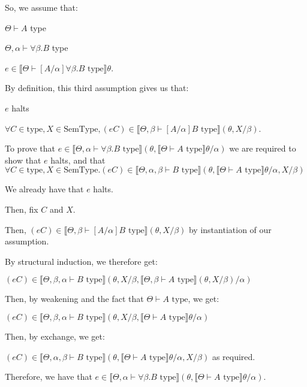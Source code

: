 \begin{enumerate}
    So, we assume that:

    $\Theta \vdash A$ type

    $\Theta, \alpha \vdash \forall \beta. B$ type

    $e \in \llbracket \Theta \vdash [A / \alpha] \forall \beta. B \text{ type}\rrbracket \theta$.

    By definition, this third assumption gives us that:

    $e$ halts

    $\forall C \in \text{type}, X \in \text{SemType}, (e C) \in \llbracket\Theta, \beta \vdash [A / \alpha]B \text{ type}\rrbracket (\theta, X / \beta)$.

    To prove that $e \in \llbracket \Theta, \alpha \vdash \forall \beta. B \text{ type}\rrbracket(\theta, \llbracket \Theta \vdash A \text{ type}\rrbracket \theta / \alpha)$ we are required to show that $e$ halts, and that $\forall C \in \text{type}, X \in \text{SemType}. (e C) \in \llbracket \Theta, \alpha, \beta \vdash B \text{ type}\rrbracket (\theta, \llbracket \Theta \vdash A\text{ type}\rrbracket \theta / \alpha,X / \beta)$

    We already have that $e$ halts.

    Then, fix $C$ and $X$.

    Then, $(e C) \in \llbracket \Theta, \beta \vdash [A / \alpha]B \text{ type}\rrbracket (\theta, X / \beta)$ by instantiation of our assumption.

    By structural induction, we therefore get:

    $(e C) \in \llbracket \Theta, \beta, \alpha \vdash B \text{ type}\rrbracket (\theta, X / \beta, \llbracket \Theta, \beta \vdash A \text{ type}\rrbracket (\theta, X / \beta) / \alpha)$

    Then, by weakening and the fact that $\Theta \vdash A \text{ type}$, we get:

    $(e C) \in \llbracket \Theta, \beta, \alpha \vdash B \text{ type}\rrbracket(\theta, X / \beta, \llbracket \Theta \vdash A \text{ type}\rrbracket \theta / \alpha)$

    Then, by exchange, we get:

    $(e C) \in \llbracket \Theta, \alpha, \beta \vdash B \text{ type}\rrbracket(\theta, \llbracket \Theta \vdash A \text{ type}\rrbracket\theta / \alpha, X / \beta)$ as required.

    Therefore, we have that $e \in \llbracket \Theta, \alpha \vdash \forall \beta. B \text{ type}\rrbracket(\theta, \llbracket \Theta \vdash A \text{ type}\rrbracket\theta / \alpha)$.


\end{enumerate}
